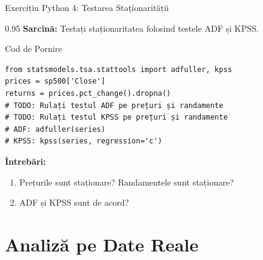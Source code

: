 \documentclass[9pt, aspectratio=169, t]{beamer}
\begin{document}
\begin{frame}[fragile]{Exercițiu Python 4: Testarea Staționarității}
    \begin{cminipage}{0.95\textwidth}
    \textbf{Sarcină:} Testați staționaritatea folosind testele ADF și KPSS.

    \vspace{0.1cm}

    \begin{block}{Cod de Pornire}
    \footnotesize
    \begin{verbatim}
from statsmodels.tsa.stattools import adfuller, kpss
prices = sp500['Close']
returns = prices.pct_change().dropna()
# TODO: Rulați testul ADF pe prețuri și randamente
# TODO: Rulați testul KPSS pe prețuri și randamente
# ADF: adfuller(series)
# KPSS: kpss(series, regression='c')
    \end{verbatim}
    \end{block}

    \textbf{Întrebări:}
    \begin{enumerate}\setlength{\itemsep}{0pt}
        \item Prețurile sunt staționare? Randamentele sunt staționare?
        \item ADF și KPSS sunt de acord?
    \end{enumerate}
    \end{cminipage}
\end{frame}

\section{Analiză pe Date Reale}
\end{document}
